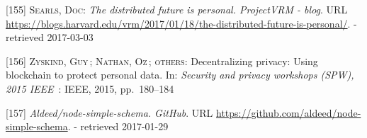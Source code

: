 \documentclass[12pt,english,a4paper,titlepage,cleardoublepage=empty,dottedtoc]{report}
\begin{document}
\hypertarget{ref-web_2017_distributed-future-is-personal}{}
{[}155{]} \textsc{Searls, Doc}: \emph{The distributed future is
personal. ProjectVRM - blog}. URL
\url{https://blogs.harvard.edu/vrm/2017/01/18/the-distributed-future-is-personal/}.
- retrieved 2017-03-03

\hypertarget{ref-paper_2015_decentralizing-privacy-using-blockchain-to-protect-personal-data}{}
{[}156{]} \textsc{Zyskind, Guy}\,; \textsc{Nathan, Oz}\,;
\textsc{others}: Decentralizing privacy: Using blockchain to protect
personal data. In: \emph{Security and privacy workshops (SPW), 2015
IEEE}~: IEEE, 2015, pp.~180--184

\hypertarget{ref-web_2017_repo_node-simple-schema}{}
{[}157{]} \emph{Aldeed/node-simple-schema. GitHub}. URL
\url{https://github.com/aldeed/node-simple-schema}. - retrieved
2017-01-29
\end{document}
